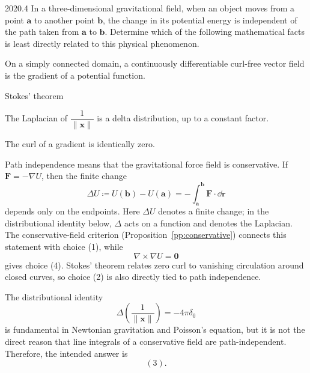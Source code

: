     \begin{pastproblem}{2020.4}
        In a three-dimensional gravitational field, when an object moves from a
        point $\mathbf{a}$ to another point $\mathbf{b}$, the change in its
        potential energy is independent of the path taken from $\mathbf{a}$ to
        $\mathbf{b}$. Determine which of the following mathematical facts is
        least directly related to this physical phenomenon.
        \begin{problemchoices}
            \item On a simply connected domain, a continuously differentiable curl-free vector field is the gradient of a potential function.
            \item Stokes' theorem
            \item The Laplacian of \(\dfrac{1}{\lVert\mathbf{x}\rVert}\) is a delta distribution, up to a constant factor.
            \item The curl of a gradient is identically zero.
        \end{problemchoices}
    \end{pastproblem}

    \begin{solution}
        Path independence means that the gravitational force field is
        conservative. If $\mathbf{F}=-\nabla U$, then the finite change
        \[
            \Delta U
            \coloneqq
            U(\mathbf{b})-U(\mathbf{a})
            =
            -\int_{\mathbf{a}}^{\mathbf{b}}\mathbf{F}\cdot\dd\mathbf{r}
        \]
        depends only on the endpoints. Here $\Delta U$ denotes a finite change;
        in the distributional identity below, $\Delta$ acts on a function and
        denotes the Laplacian. The conservative-field criterion (Proposition~\ref{pp:conservative}) connects this statement with choice (1), while
        \[
            \nabla\times\nabla U=\mathbf{0}
        \]
        gives choice (4). Stokes' theorem relates zero curl to vanishing
        circulation around closed curves, so choice (2) is also directly tied
        to path independence.

        The distributional identity
        \[
            \Delta\left(\frac{1}{\lVert\mathbf{x}\rVert}\right)
            =
            -4\pi\delta_0
        \]
        is fundamental in Newtonian gravitation and Poisson's equation, but it
        is not the direct reason that line integrals of a conservative field are
        path-independent. Therefore, the intended answer is
        \[
            \boxed{(3)}.
        \]
    \end{solution}

